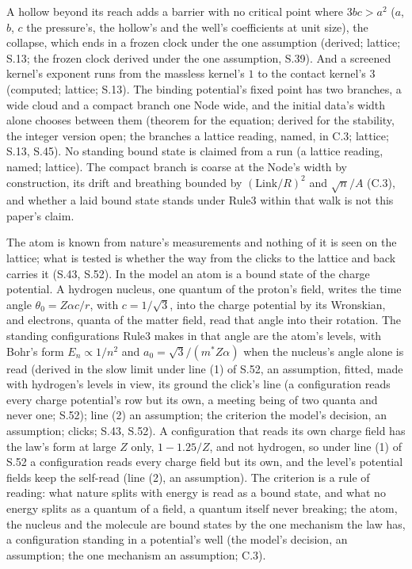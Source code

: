 \documentclass[pdflatex,sn-mathphys-num]{sn-jnl}
\theoremstyle{thmstyleone}
\begin{document}
A hollow beyond its reach adds a barrier with no critical point where $3bc > a^2$ ($a$, $b$, $c$ the pressure's, the hollow's and the well's coefficients at unit size), the collapse, which ends in a frozen clock under the one assumption (derived; lattice; S.13; the frozen clock derived under the one assumption, S.39). And a screened kernel's exponent runs from the massless kernel's $1$ to the contact kernel's $3$ (computed; lattice; S.13). The binding potential's fixed point has two branches, a wide cloud and a compact branch one Node wide, and the initial data's width alone chooses between them (theorem for the equation; derived for the stability, the integer version open; the branches a lattice reading, named, in C.3; lattice; S.13, S.45). No standing bound state is claimed from a run (a lattice reading, named; lattice). The compact branch is coarse at the Node's width by construction, its drift and breathing bounded by $(\mathrm{Link} / R)^2$ and $\sqrt n / A$ (C.3), and whether a laid bound state stands under Rule3 within that walk is not this paper's claim.

The atom is known from nature's measurements and nothing of it is seen on the lattice; what is tested is whether the way from the clicks to the lattice and back carries it (S.43, S.52). In the model an atom is a bound state of the charge potential. A hydrogen nucleus, one quantum of the proton's field, writes the time angle $\theta_0 = Z\alpha c / r$, with $c = 1 / \sqrt 3$, into the charge potential by its Wronskian, and electrons, quanta of the matter field, read that angle into their rotation. The standing configurations Rule3 makes in that angle are the atom's levels, with Bohr's form $E_n \propto 1 / n^2$ and $a_0 = \sqrt 3 / (m^* Z\alpha)$ when the nucleus's angle alone is read (derived in the slow limit under line (1) of S.52, an assumption, fitted, made with hydrogen's levels in view, its ground the click's line (a configuration reads every charge potential's row but its own, a meeting being of two quanta and never one; S.52); line (2) an assumption; the criterion the model's decision, an assumption; clicks; S.43, S.52). A configuration that reads its own charge field has the law's form at large $Z$ only, $1 - 1.25 / Z$, and not hydrogen, so under line (1) of S.52 a configuration reads every charge field but its own, and the level's potential fields keep the self-read (line (2), an assumption). The criterion is a rule of reading: what nature splits with energy is read as a bound state, and what no energy splits as a quantum of a field, a quantum itself never breaking; the atom, the nucleus and the molecule are bound states by the one mechanism the law has, a configuration standing in a potential's well (the model's decision, an assumption; the one mechanism an assumption; C.3).
\end{document}

